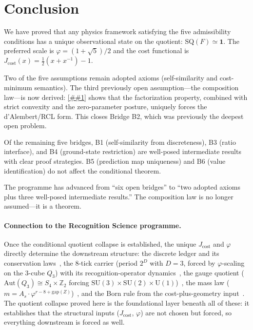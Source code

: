 \documentclass[11pt]{article}
\providecommand{\cref}[1]{\ref{##1}}%
\newcommand{\Jcost}{J_{\mathrm{cost}}}
\newcommand{\SQ}{\mathrm{SQ}}
\theoremstyle{definition}
\theoremstyle{remark}
\begin{document}
\section{Conclusion}\label{sec:conclusion}

We have proved that any physics framework satisfying the five
admissibility conditions has a unique observational state on the
quotient: $\SQ(F) \simeq \mathbf{1}$.
The preferred scale is $\varphi = (1+\sqrt{5})/2$ and the cost
functional is $\Jcost(x) = \frac{1}{2}(x + x^{-1}) - 1$.

Two of the five assumptions remain adopted axioms
(self-similarity and cost-minimum semantics).
The third previously open assumption---the composition law---is
now derived: \cref{thm:b2-closure} shows that the factorization
property, combined with strict convexity and the zero-parameter
posture, uniquely forces the d'Alembert/RCL form.
This closes Bridge B2, which was previously the deepest open
problem.

Of the remaining five bridges, B1 (self-similarity from
discreteness), B3 (ratio interface), and B4 (ground-state
restriction) are well-posed intermediate results with clear
proof strategies.
B5 (prediction map uniqueness) and B6 (value identification)
do not affect the conditional theorem.

The programme has advanced from ``six open bridges'' to
``two adopted axioms plus three well-posed intermediate results.''
The composition law is no longer assumed---it is a theorem.

\paragraph{Connection to the Recognition Science programme.}
Once the conditional quotient collapse is established, the unique
$\Jcost$ and $\varphi$ directly determine the downstream
structure:
the discrete ledger and its conservation
laws~\cite{CostLedger2026},
the 8-tick carrier (period $2^D$ with $D = 3$, forced by
$\varphi$-scaling on the 3-cube $Q_3$)
with its recognition-operator dynamics~\cite{RecogOp2026},
the gauge quotient ($\mathrm{Aut}(Q_3) \cong S_4 \times
\mathbb{Z}_2$ forcing
$\mathrm{SU}(3) \times \mathrm{SU}(2) \times
\mathrm{U}(1)$)~\cite{RecogGeom2026},
the mass law ($m = A_s \cdot \varphi^{r - 8 +
\mathrm{gap}(Z)}$)~\cite{WZ2026},
and the Born rule from the cost-plus-geometry
input~\cite{BornRule2026}.
The quotient collapse proved here is the foundational layer
beneath all of these: it establishes that the structural
inputs ($\Jcost$, $\varphi$) are not chosen but forced, so
everything downstream is forced as well.
\end{document}

